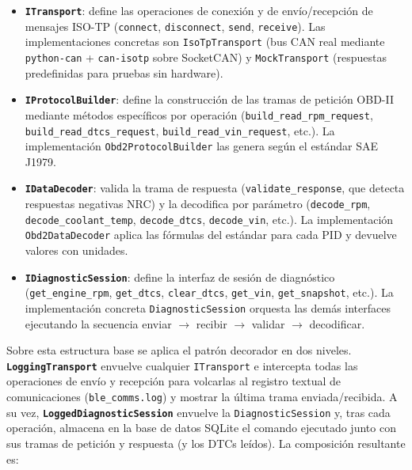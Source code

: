 \begin{itemize}
    \item \textbf{\texttt{ITransport}}: define las operaciones de conexión y de envío/recepción de mensajes ISO-TP (\texttt{connect}, \texttt{disconnect}, \texttt{send}, \texttt{receive}). Las implementaciones concretas son \texttt{IsoTpTransport} (bus CAN real mediante \texttt{python-can} + \texttt{can-isotp} sobre SocketCAN) y \texttt{MockTransport} (respuestas predefinidas para pruebas sin hardware).

    \item \textbf{\texttt{IProtocolBuilder}}: define la construcción de las tramas de petición OBD-II mediante métodos específicos por operación (\texttt{build\_read\_rpm\_request}, \texttt{build\_read\_dtcs\_request}, \texttt{build\_read\_vin\_request}, etc.). La implementación \texttt{Obd2ProtocolBuilder} las genera según el estándar SAE J1979.

    \item \textbf{\texttt{IDataDecoder}}: valida la trama de respuesta (\texttt{validate\_response}, que detecta respuestas negativas NRC) y la decodifica por parámetro (\texttt{decode\_rpm}, \texttt{decode\_coolant\_temp}, \texttt{decode\_dtcs}, \texttt{decode\_vin}, etc.). La implementación \texttt{Obd2DataDecoder} aplica las fórmulas del estándar para cada PID y devuelve valores con unidades.

    \item \textbf{\texttt{IDiagnosticSession}}: define la interfaz de sesión de diagnóstico (\texttt{get\_engine\_rpm}, \texttt{get\_dtcs}, \texttt{clear\_dtcs}, \texttt{get\_vin}, \texttt{get\_snapshot}, etc.). La implementación concreta \texttt{DiagnosticSession} orquesta las demás interfaces ejecutando la secuencia enviar $\rightarrow$ recibir $\rightarrow$ validar $\rightarrow$ decodificar.
\end{itemize}

Sobre esta estructura base se aplica el patrón decorador en dos niveles. \textbf{\texttt{LoggingTransport}} envuelve cualquier \texttt{ITransport} e intercepta todas las operaciones de envío y recepción para volcarlas al registro textual de comunicaciones (\texttt{ble\_comms.log}) y mostrar la última trama enviada/recibida. A su vez, \textbf{\texttt{LoggedDiagnosticSession}} envuelve la \texttt{DiagnosticSession} y, tras cada operación, almacena en la base de datos SQLite el comando ejecutado junto con sus tramas de petición y respuesta (y los DTCs leídos). La composición resultante es:

